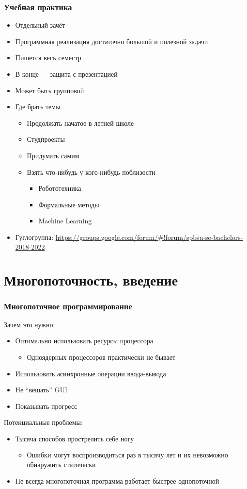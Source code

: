 \documentclass[xetex,mathserif,serif]{beamer}
\begin{document}
	\begin{frame}
		\frametitle{Учебная практика}
		\begin{itemize}
			\item Отдельный зачёт
			\item Программная реализация достаточно большой и полезной задачи
			\item Пишется весь семестр
			\item В конце --- защита с презентацией
			\item Может быть групповой
			\item Где брать темы
			\begin{itemize}
				\item Продолжать начатое в летней школе
				\item Студпроекты
				\item Придумать самим
				\item Взять что-нибудь у кого-нибудь поблизости
				\begin{itemize}
					\item Робототехника
					\item Формальные методы
					\item Machine Learning
				\end{itemize}
			\end{itemize}
			\item Гуглогруппа: \url{https://groups.google.com/forum/\#!forum/spbsu-se-bachelors-2018-2022}
		\end{itemize}
	\end{frame}

	\section{Многопоточность, введение}

	\begin{frame}
		\frametitle{Многопоточное программирование}
		Зачем это нужно:
		\begin{itemize}
			\item Оптимально использовать ресурсы процессора
			\begin{itemize}
				\item Одноядерных процессоров практически не бывает
			\end{itemize}
			\item Использовать асинхронные операции ввода-вывода
			\item Не ``вешать'' GUI
			\item Показывать прогресс
		\end{itemize}
		\vspace{5mm}
		Потенциальные проблемы:
		\begin{itemize}
			\item Тысяча способов прострелить себе ногу
			\begin{itemize}
				\item Ошибки могут воспроизводиться раз в тысячу лет и их невозможно обнаружить статически
			\end{itemize}
			\item Не всегда многопоточная программа работает быстрее однопоточной
		\end{itemize}
	\end{frame}
\end{document}

